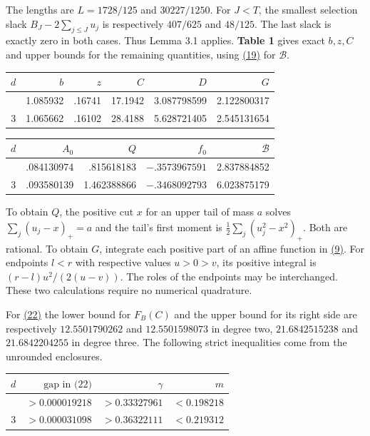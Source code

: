 \documentclass[11pt,a4paper]{article}
\newcounter{none}
\begin{document}
The lengths are \(L=1728/125\) and \(30227/1250\). For \(J<T\), the smallest selection slack \(B_J-2\sum_{j\le J}u_j\) is respectively \(407/625\) and \(48/125\). The last slack is exactly zero in both cases. Thus Lemma 3.1 applies. \textbf{Table 1} gives exact \(b,z,C\) and upper bounds for the remaining quantities, using \hyperref[eq:19]{(19)} for \(\mathcal B\).

{\def\LTcaptype{none} %
{\small
\begin{longtable}[]{@{}crrrrr@{}}
\toprule\noalign{}
\(d\) & \(b\) & \(z\) & \(C\) & \(D\) & \(G\) \\
\midrule\noalign{}
\endhead
\bottomrule\noalign{}
\endlastfoot
2 & 1.085932 & .16741 & 17.1942 & 3.087798599 & 2.122800317 \\
3 & 1.065662 & .16102 & 28.4188 & 5.628721405 & 2.545131654 \\
\end{longtable}
}
}

{\def\LTcaptype{none} %
{\small
\begin{longtable}[]{@{}crrrr@{}}
\toprule\noalign{}
\(d\) & \(A_0\) & \(Q\) & \(f_0\) & \(\mathcal B\) \\
\midrule\noalign{}
\endhead
\bottomrule\noalign{}
\endlastfoot
2 & .084130974 & .815618183 & \(-.3573967591\) & 2.837884852 \\
3 & .093580139 & 1.462388866 & \(-.3468092793\) & 6.023875179 \\
\end{longtable}
}
}

To obtain \(Q\), the positive cut \(x\) for an upper tail of mass \(a\) solves \(\sum_j(u_j-x)_+=a\) and the tail's first moment is \(\frac12\sum_j(u_j^2-x^2)_+\). Both are rational. To obtain \(G\), integrate each positive part of an affine function in \hyperref[eq:9]{(9)}. For endpoints \(l<r\) with respective values \(u>0>v\), its positive integral is \((r-l)u^2/(2(u-v))\). The roles of the endpoints may be interchanged. These two calculations require no numerical quadrature.

For \hyperref[eq:22]{(22)} the lower bound for \(F_B(C)\) and the upper bound for its right side are respectively \(12.5501790262\) and \(12.5501598073\) in degree two, \(21.6842515238\) and \(21.6842204255\) in degree three. The following strict inequalities come from the unrounded enclosures.

{\def\LTcaptype{none} %
{\small
\begin{longtable}[]{@{}crrr@{}}
\toprule\noalign{}
\(d\) & \(\text{gap in (22)}\) & \(\gamma\) & \(m\) \\
\midrule\noalign{}
\endhead
\bottomrule\noalign{}
\endlastfoot
2 & \(>0.000019218\) & \(>0.33327961\) & \(<0.198218\) \\
3 & \(>0.000031098\) & \(>0.36322111\) & \(<0.219312\) \\
\end{longtable}
}
}
\end{document}
